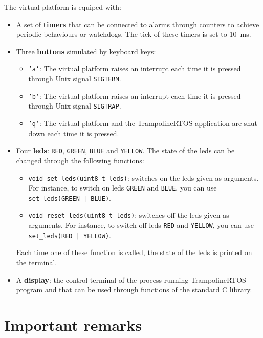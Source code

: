 \documentclass[11pt]{report}
\begin{document}
The virtual platform is equiped with:
\begin{itemize}
  \item
    A set of \textbf{timers} that can be connected to alarms through counters to achieve periodic behaviours or watchdogs.
    The tick of these timers is set to \SI{10}{\milli\second}.
  \item
    Three \textbf{buttons} simulated by keyboard keys:
    \begin{itemize}
      \item
        \texttt{'a'}: The virtual platform raises an interrupt each time it is pressed through Unix signal \verb|SIGTERM|.

      \item
        \texttt{'b'}: The virtual platform raises an interrupt each time it is pressed through Unix signal \verb|SIGTRAP|.

      \item
        \texttt{'q'}: The virtual platform and the TrampolineRTOS application are shut down each time it is pressed.
    \end{itemize}

  \item
    Four \textbf{leds}: \verb|RED|, \verb|GREEN|, \verb|BLUE| and \verb|YELLOW|.
    The state of the leds can be changed through the following functions:
    \begin{itemize}
      \item
        \verb|void set_leds(uint8_t leds)|: switches on the leds given as arguments.
        For instance, to switch on leds \verb|GREEN| and \verb|BLUE|, you can use \verb-set_leds(GREEN | BLUE)-.
      \item
        \verb|void reset_leds(uint8_t leds)|: switches off the leds given as arguments.
        For instance, to switch off leds \verb|RED| and \verb|YELLOW|, you can use \verb-set_leds(RED | YELLOW)-.
    \end{itemize}
    Each time one of these function is called, the state of the leds is printed on the terminal.
  \item
    A \textbf{display}: the control terminal of the process running TrampolineRTOS program and that can be used through functions of the standard C library.
\end{itemize}

\section{Important remarks}
\end{document}

